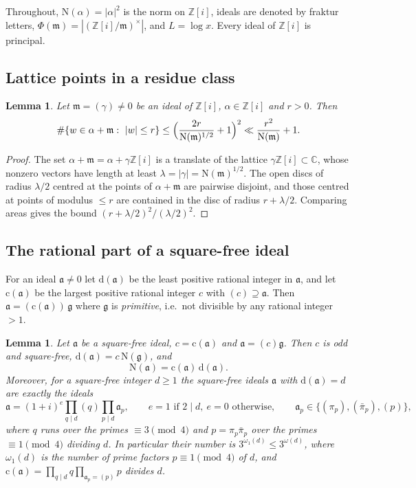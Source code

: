 \documentclass[11pt]{amsart}
\newtheorem{lemma}[theorem]{Lemma}
\theoremstyle{remark}
\newcommand{\Z}{\mathbb{Z}}
\newcommand{\C}{\mathbb{C}}
\newcommand{\N}{\mathrm{N}}
\newcommand{\fa}{\mathfrak{a}}
\newcommand{\fg}{\mathfrak{g}}
\newcommand{\fm}{\mathfrak{m}}
\newcommand{\dd}{\mathrm{d}}
\newcommand{\cc}{\mathrm{c}}
\begin{document}
Throughout, $\N(\alpha)=|\alpha|^2$ is the norm on $\Z[i]$, ideals are denoted by fraktur letters, $\Phi(\fm)=|(\Z[i]/\fm)^\times|$, and $L=\log x$. Every ideal of $\Z[i]$ is principal.

\subsection{Lattice points in a residue class}

\begin{lemma}\label{lem:lattice}
Let $\fm=(\gamma)\neq 0$ be an ideal of $\Z[i]$, $\alpha\in\Z[i]$ and $r>0$. Then
\[
\#\{w\in\alpha+\fm:\ |w|\le r\}\le\Bigl(\frac{2r}{\N(\fm)^{1/2}}+1\Bigr)^2\ll \frac{r^2}{\N(\fm)}+1.
\]
\end{lemma}

\begin{proof}
The set $\alpha+\fm=\alpha+\gamma\Z[i]$ is a translate of the lattice $\gamma\Z[i]\subset\C$, whose nonzero vectors have length at least $\lambda=|\gamma|=\N(\fm)^{1/2}$. The open discs of radius $\lambda/2$ centred at the points of $\alpha+\fm$ are pairwise disjoint, and those centred at points of modulus $\le r$ are contained in the disc of radius $r+\lambda/2$. Comparing areas gives the bound $(r+\lambda/2)^2/(\lambda/2)^2$.
\end{proof}

\subsection{The rational part of a square-free ideal}

For an ideal $\fa\ne 0$ let $\dd(\fa)$ be the least positive rational integer in $\fa$, and let $\cc(\fa)$ be the largest positive rational integer $c$ with $(c)\supseteq\fa$. Then $\fa=(\cc(\fa))\,\fg$ where $\fg$ is \emph{primitive}, i.e.\ not divisible by any rational integer $>1$.

\begin{lemma}\label{lem:rational}
Let $\fa$ be a square-free ideal, $c=\cc(\fa)$ and $\fa=(c)\fg$. Then $c$ is odd and square-free, $\dd(\fa)=c\,\N(\fg)$, and
\[
\N(\fa)=\cc(\fa)\,\dd(\fa).
\]
Moreover, for a square-free integer $d\ge 1$ the square-free ideals $\fa$ with $\dd(\fa)=d$ are exactly the ideals
\[
\fa=(1+i)^{e}\prod_{q\mid d}(q)\prod_{p\mid d}\fa_p,\qquad e=1 \text{ if } 2\mid d,\ e=0 \text{ otherwise},\qquad \fa_p\in\{(\pi_p),(\bar\pi_p),(p)\},
\]
where $q$ runs over the primes $\equiv 3\pmod 4$ and $p=\pi_p\bar\pi_p$ over the primes $\equiv 1\pmod 4$ dividing $d$. In particular their number is $3^{\omega_1(d)}\le 3^{\omega(d)}$, where $\omega_1(d)$ is the number of prime factors $p\equiv 1\pmod 4$ of $d$, and $\cc(\fa)=\prod_{q\mid d}q\prod_{\fa_p=(p)}p$ divides $d$.
\end{lemma}
\end{document}
